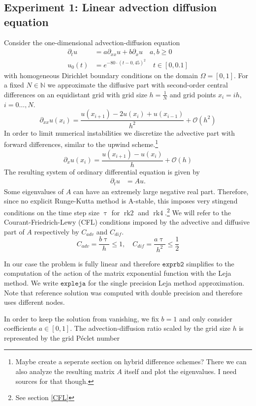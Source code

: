 \documentclass{scrartcl}
\begin{document}
\subsection{Experiment 1: Linear advection diffusion equation}
Consider the one-dimensional advection-diffusion equation
\begin{align*}
\partial_tu &= a\partial_{xx}u + b\partial_xu \quad a,b\ge 0\\
u_0(t) &= e^{-80\cdot(t-0,45)^2} \quad t\in[0,0.1]
\end{align*}
with homogeneous Dirichlet boundary conditions on the domain $\Omega = [0,1]$. 
For a fixed $N\in\mathbb N$ we approximate the diffusive part with second-order central differences on an equidistant grid with grid size $h = \frac{1}{N}$ and grid points $x_i = ih$, $i=0\dots,N$.
\[\partial_{xx}u(x_i) = \frac{u(x_{i+1}) - 2u(x_i) + u(x_{i-1})}{{h}^2} + \mathcal{O}({h}^2)\]
In order to limit numerical instabilities we discretize the advective part with forward differences, similar to the upwind scheme.\footnote{Maybe create a seperate section on hybrid difference schemes? There we can also analyze the resulting matrix $A$ itself and plot the eigenvalues. I need sources for that though.}
\[\partial_{x}u(x_i) = \frac{u(x_{i+1}) - u(x_i)}{h} + \mathcal{O}(h)\]
The resulting system of ordinary differential equation is given by
\begin{align*}
\partial_tu &= Au.
\end{align*} 
Some eigenvalues of $A$ can have an extremely large negative real part. Therefore, since no explicit Runge-Kutta method is A-stable, this imposes very stingend conditions on the time step size $\uptau$ for $\operatorname{rk2}$ and $\operatorname{rk4}$.\footnote{See section \ref{CFL}} We will refer to the Courant-Friedrich-Lewy (CFL) conditions imposed by the advective and diffusive part of $A$ respectively by $C_{adv}$ and $C_{dif}$.  
\[ C_{adv} = \frac{b\uptau}{h} \le 1, \quad C_{dif} = \frac{a\uptau}{h^2} \le \frac{1}{2}\] 



In our case the problem is fully linear and therefore $\texttt{exprb2}$ simplifies to the computation of the action of the matrix exponential function with the Leja method. We write $\texttt{expleja}$ for the single precision Leja method approximation. Note that reference solution was computed with double precision and therefore uses different nodes.

In order to keep the solution from vanishing, we fix $b = 1$ and only consider coefficients $a\in[0,1]$. The advection-diffusion ratio scaled by the grid size $h$ is represented by the grid P\'eclet number
\end{document}

